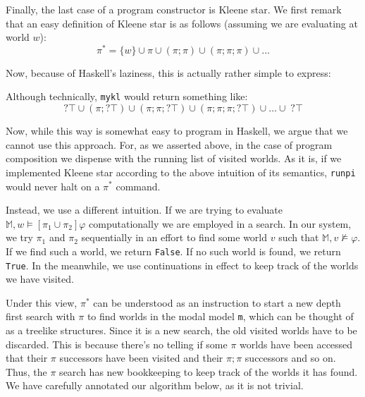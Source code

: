 \documentclass[11pt]{article}
\theoremstyle{definition}
\begin{document}
Finally, the last case of a program constructor is Kleene star.  We first remark that an easy definition of Kleene star is as follows (assuming we are evaluating at world $w$):
\[ \pi^\ast = \{w\} \cup \pi \cup (\pi ; \pi) \cup (\pi ; \pi ; \pi) \cup \ldots \]

Now, because of Haskell's laziness, this is actually rather simple to express:


Although technically, \texttt{mykl} would return something like:
\[ ?\top \cup (\pi ; ?\top) \cup (\pi ; \pi ; ?\top) \cup (\pi ; \pi ; \pi ; ?\top) \cup \ldots \cup\; ?\top \]

Now, while this way is somewhat easy to program in Haskell, we argue that we cannot use this approach.  For, as we asserted above, in the case of program composition we dispense with the running list of visited worlds.  As it is, if we implemented Kleene star according to the above intuition of its semantics, \texttt{runpi} would never halt on a $\pi^\ast$ command.

Instead, we use a different intuition.  If we are trying to evaluate $,w\models [\pi_1 \cup \pi_2] \varphi$ computationally we are employed in a search. In our system, we try $\pi_1$ and $\pi_2$ sequentially in an effort to find some world $v$ such that $,v\not\models\varphi$.  If we find such a world, we return \texttt{False}.  If no such world is found, we return \texttt{True}.  In the meanwhile, we use continuations in effect to keep track of the worlds we have visited.

Under this view, $\pi^\ast$ can be understood as an instruction to start a new depth first search with $\pi$ to find worlds in the modal model \texttt{m}, which can be thought of as a treelike structures. Since it is a new search, the old visited worlds have to be discarded. This is because there's no telling if some $\pi$ worlds have been accessed that their $\pi$ successors have been visited and their $\pi ; \pi$ successors and so on.  Thus, the $\pi$ search has new bookkeeping to keep track of the worlds it has found.  We have carefully annotated our algorithm below, as it is not trivial.
\end{document}
